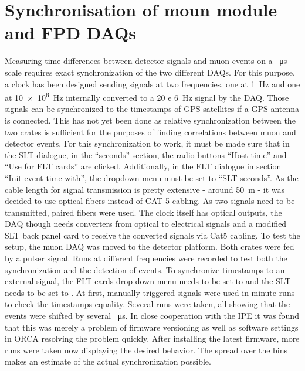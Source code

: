   \section{Synchronisation of moun module and FPD DAQs}
  \label{ch:Analysis:sec:Synchronisation of moun module and FPD DAQs}
  Measuring time differences between detector signals and muon events on a \SI{}{\micro\second} scale requires exact synchronization of the two different DAQs. For this purpose, a clock has been designed sending signals at two frequencies. one at \SI{1}{\hertz} and one at \SI{10e6}{\hertz} internally converted to a \SI{20 e 6}{\hertz} signal by the DAQ. Those signals can be synchronized to the timestamps of GPS satellites if a GPS antenna is connected. This has not yet been done as relative synchronization between the two crates is sufficient for the purposes of finding correlations between muon and detector events. 
  For this synchronization to work, it must be made sure that in the SLT dialogue, in the ``seconds'' section, the radio buttons ``Host time'' and ``Use for FLT cards'' are clicked. Additionally, in the FLT dialogue in section ``Init event time with'', the dropdown menu must be set to ``SLT seconds''.
  As the cable length for signal transmission is pretty extensive - around \SI{50}{\meter} - it was decided to use optical fibers instead of CAT 5 cabling. As two signals need to be transmitted, paired  fibers were used. The clock itself has optical outputs, the DAQ though needs converters from optical to electrical signals and a modified SLT back panel card to receive the converted 
  signals via Cat5 cabling.
  To test the setup, the muon DAQ was moved to the detector platform. Both crates were fed by a pulser signal. Runs at different frequencies were recorded to test both the synchronization and the detection of events. To synchronize timestamps to an external signal, the FLT cards drop down menu needs to be set to  and the SLT needs to be set to .
  At first, manually triggered signals were used in minute runs to check the timestamps equality. Several runs were taken, all showing that the events were shifted by several \SI{}{\micro\second}.
  In close cooperation with the IPE it was found that this was merely a problem of firmware versioning as well as software settings in ORCA resolving the problem quickly. After installing the latest firmware, more runs were taken now displaying the desired behavior.
  The spread over the bins makes an estimate of the actual synchronization possible. 

